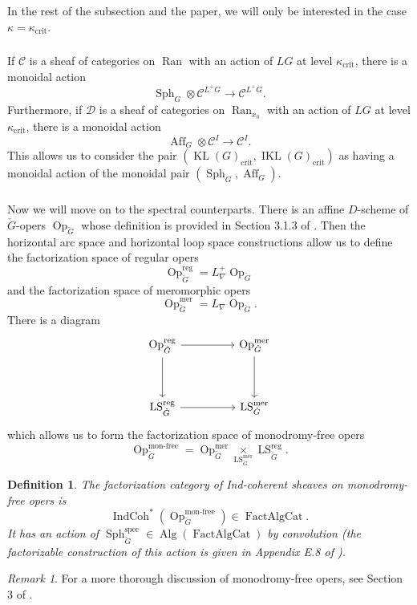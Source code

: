\documentclass[10pt]{amsart}
\newtheorem{defn}[subsubsection]{Definition}
\theoremstyle{remark}
\newtheorem{rem}[subsubsection]{Remark}
\newcommand{\on}[1]{\operatorname{#1}}
\newcommand{\IndCoh}{\on{IndCoh}}
\newcommand{\Gcheck}{\check{G}}
\newcommand{\Ran}{\on{Ran}}
\newcommand{\FactAlgCat}{\on{FactAlgCat}}
\newcommand{\sssec}[1]{\subsubsection{}}
\begin{document}
\sssec{}
In the rest of the subsection and the paper, we will only be interested in the case $\kappa = \kappa_{\on{crit}}$.

\sssec{}
If $\mathcal{C}$ is a sheaf of categories on $\Ran$ with an action of $LG$ at level $\kappa_{\on{crit}}$, there is a monoidal action
$$
\on{Sph}_G \otimes \mathcal{C}^{L^+G} \longrightarrow \mathcal{C}^{L^+G}.
$$
Furthermore, if $\mathcal{D}$ is a sheaf of categories on $\Ran_{x_0}$ with an action of $LG$ at level $\kappa_{\on{crit}}$, there is a monoidal action
$$
\on{Aff}_G \otimes \mathcal{C}^{I} \longrightarrow \mathcal{C}^{I}.
$$
This allows us to consider the pair $(\on{KL}(G)_{\on{crit}}, \on{IKL}(G)_{\on{crit}})$ as having a monoidal action of the monoidal pair $(\on{Sph}_G, \on{Aff}_G)$.

\sssec{}
Now we will move on to the spectral counterparts. There is an affine $D$-scheme of $\Gcheck$-opers $\on{Op}_{\Gcheck}$ whose definition is provided in Section 3.1.3 of \cite{GLC2}. Then the horizontal arc space and horizontal loop space constructions allow us to define the factorization space of regular opers
$$
\on{Op}_{\Gcheck}^{\on{reg}} = L_{\nabla}^+\on{Op}_{\Gcheck}
$$
and the factorization space of meromorphic opers
$$
\on{Op}_{\Gcheck}^{\on{mer}} = L_{\nabla}\on{Op}_{\Gcheck}.
$$
There is a diagram
$$
\begin{tikzcd}
	{\on{Op}_{\Gcheck}^{\on{reg}}} && {\on{Op}_{\Gcheck}^{\on{mer}}} \\
	\\
	{\on{LS}_{\Gcheck}^{\on{reg}}} && {\on{LS}_{\Gcheck}^{\on{mer}}}
	\arrow[from=1-1, to=1-3]
	\arrow[from=1-1, to=3-1]
	\arrow[from=1-3, to=3-3]
	\arrow[from=3-1, to=3-3]
\end{tikzcd}
$$
which allows us to form the factorization space of monodromy-free opers
$$
\on{Op}_{\Gcheck}^{\on{mon-free}} = \on{Op}_{\Gcheck}^{\on{mer}} \underset{\on{LS}_{\Gcheck}^{\on{mer}}}{\times} \on{LS}_{\Gcheck}^{\on{reg}}.
$$

\begin{defn}
    The factorization category of Ind-coherent sheaves on monodromy-free opers is 
    $$
    \IndCoh^*(\on{Op}_{\Gcheck}^{\on{mon-free}}) \in \FactAlgCat.
    $$
    It has an action of $\on{Sph}_{\Gcheck}^{\on{spec}} \in \on{Alg}(\FactAlgCat)$ by convolution (the factorizable construction of this action is given in Appendix E.8 of \cite{GLC2}).
\end{defn}

\begin{rem}
For a more thorough discussion of monodromy-free opers, see Section 3 of \cite{GLC2}.
\end{rem}
\end{document}
